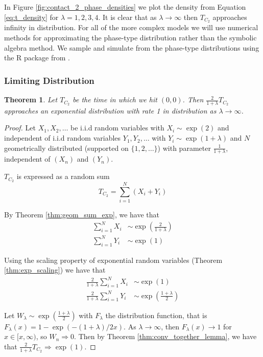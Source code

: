 \documentclass{article}
\theoremstyle{plain}
\newtheorem{theorem}{Theorem}[section]
\theoremstyle{definition}
\theoremstyle{remark}
\numberwithin{equation}{section}
\begin{document}
In Figure \ref{fig:contact_2_phase_densities} we plot the density from Equation \ref{eq:t_density} for $\lambda = 1, 2, 3, 4$.
It is clear that as $\lambda \to \infty$ then $T_{C_2}$ approaches infinity in distribution.
For all of the more complex models we will use numerical methods for approximating the phase-type distribution rather than the symbolic algebra method.
We sample and simulate from the phase-type distributions using the R package from \cite{actuar2008}.

\subsubsection{Limiting Distribution}

\begin{theorem}
Let $T_{C_2}$ be the time in which we hit $(0,0)$.
Then $\frac{2}{1 + \lambda} T_{C_2}$ approaches an exponential distribution with rate 1 in distribution as $\lambda \to \infty$.
\end{theorem}

\begin{proof}
Let $X_1, X_2, \ldots$ be i.i.d random variables with
$X_i \sim \exp(2)$ and independent of i.i.d random variables $Y_1, Y_2, \ldots$ with  $Y_i \sim \exp(1 + \lambda)$ and
$N$ geometrically distributed (supported on $\{1,2,\ldots\}$) with parameter $\frac{1}{1 + \lambda}$, independent of $(X_n)$ and $(Y_n)$.

$T_{C_2}$ is expressed as a random sum
$$
T_{C_2} = \sum_{i = 1}^N (X_i + Y_i)
$$

By Theorem \ref{thm:geom_sum_exp}, we have that
\begin{align*}
    \sum_{i = 1}^N X_i &\sim \exp\left( \frac{2}{1 + \lambda} \right)\\
    \sum_{i = 1}^N Y_i &\sim \exp( 1 )
\end{align*}

Using the scaling property of exponential random variables (Theorem \ref{thm:exp_scaling}) we have that
\begin{align*}
    \frac{2}{1 + \lambda}\sum_{i = 1}^N X_i &\sim \exp( 1 )\\
    \frac{2}{1 + \lambda}\sum_{i = 1}^N Y_i &\sim \exp \left( \frac{1 + \lambda}{2} \right)
\end{align*}

Let $W_\lambda \sim \exp \left( \frac{1 + \lambda}{2} \right)$ with $F_\lambda$ the distribution function, that is $F_\lambda(x) = 1 - \exp(-(1 + \lambda)/2 x)$.
As $\lambda \to \infty$, then $F_\lambda(x) \to 1$ for $x \in [x, \infty)$, so $W_n \Rightarrow 0$.
Then by Theorem \ref{thm:conv_together_lemma}, we have that $\frac{2}{1 + \lambda} T_{C_2} \Rightarrow \exp(1)$.
\end{proof}
\end{document}
